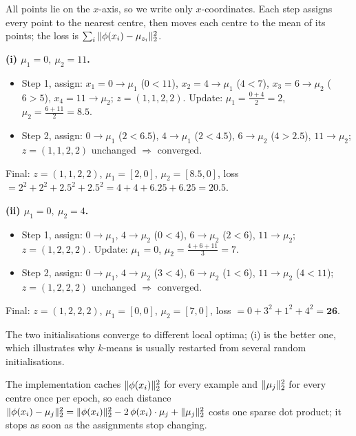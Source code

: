 \begin{solution}
All points lie on the $x$-axis, so we write only $x$-coordinates. Each step assigns every point to the
nearest centre, then moves each centre to the mean of its points; the loss is
$\sum_i\| \phi(x_i)-\mu_{z_i}\|_{2}^2$.

\textbf{(i) $\mu_1=0,\ \mu_2=11$.}
\begin{itemize}[nosep]
  \item Step 1, assign: $x_1{=}0\to\mu_1$ ($0<11$), $x_2{=}4\to\mu_1$ ($4<7$), $x_3{=}6\to\mu_2$ ($6>5$),
        $x_4{=}11\to\mu_2$; $z=(1,1,2,2)$. Update: $\mu_1=\tfrac{0+4}{2}=2$, $\mu_2=\tfrac{6+11}{2}=8.5$.
  \item Step 2, assign: $0\to\mu_1$ ($2<6.5$), $4\to\mu_1$ ($2<4.5$), $6\to\mu_2$ ($4>2.5$), $11\to\mu_2$;
        $z=(1,1,2,2)$ unchanged $\Rightarrow$ converged.
\end{itemize}
Final: $z=(1,1,2,2)$, $\mu_1=[2,0]$, $\mu_2=[8.5,0]$,
loss $=2^2+2^2+2.5^2+2.5^2=4+4+6.25+6.25=\mathbf{20.5}$.

\textbf{(ii) $\mu_1=0,\ \mu_2=4$.}
\begin{itemize}[nosep]
  \item Step 1, assign: $0\to\mu_1$, $4\to\mu_2$ ($0<4$), $6\to\mu_2$ ($2<6$), $11\to\mu_2$; $z=(1,2,2,2)$.
        Update: $\mu_1=0$, $\mu_2=\tfrac{4+6+11}{3}=7$.
  \item Step 2, assign: $0\to\mu_1$, $4\to\mu_2$ ($3<4$), $6\to\mu_2$ ($1<6$), $11\to\mu_2$ ($4<11$);
        $z=(1,2,2,2)$ unchanged $\Rightarrow$ converged.
\end{itemize}
Final: $z=(1,2,2,2)$, $\mu_1=[0,0]$, $\mu_2=[7,0]$, loss $=0+3^2+1^2+4^2=\mathbf{26}$.

The two initialisations converge to different local optima; (i) is the better one, which illustrates why
$k$-means is usually restarted from several random initialisations.
\end{solution}

The implementation caches $\| \phi(x_i)\|_{2}^2$ for every example and $\| \mu_j\|_{2}^2$ for every centre once
per epoch, so each distance $\| \phi(x_i)-\mu_j\|_{2}^2=\| \phi(x_i)\|_{2}^2-2\,\phi(x_i)\cdot\mu_j+\| \mu_j\|_{2}^2$
costs one sparse dot product; it stops as soon as the assignments stop changing.

